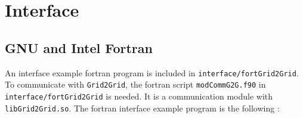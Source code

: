 \pagebreak
	\section{Interface}
	\label{chap:interfaceLang}

		\subsection{GNU and Intel Fortran}

		An interface example fortran program is included in \texttt{interface/fortGrid2Grid}. To communicate with \texttt{Grid2Grid}, the fortran script \texttt{modCommG2G.f90} in \texttt{interface/}\texttt{fortGrid2Grid} is needed. It is a communication module with \texttt{libGrid2Grid.so}. The fortran interface example program is the following :

